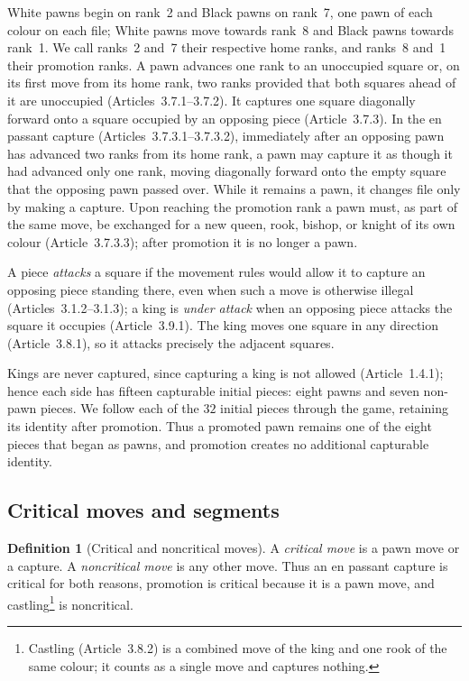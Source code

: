 \documentclass[11pt]{article}
\theoremstyle{definition}
\newtheorem{definition}[theorem]{Definition}
\begin{document}
White pawns begin on rank~2 and Black pawns on rank~7, one pawn of each
colour on each file; White pawns move towards rank~8 and Black pawns
towards rank~1. We call ranks~2 and~7 their respective home
ranks, and ranks~8 and~1 their promotion ranks. A pawn advances one rank to
an unoccupied square or, on its first move from its home rank, two ranks
provided that both squares ahead of it are unoccupied
(Articles~3.7.1--3.7.2). It captures one square diagonally forward onto a
square occupied by an opposing piece (Article~3.7.3). In the en passant
capture (Articles~3.7.3.1--3.7.3.2), immediately after an opposing pawn has
advanced two ranks from its home rank, a pawn may capture it as though it
had advanced only one rank, moving diagonally forward onto the empty square
that the opposing pawn passed over. While it remains a pawn, it changes
file only by making a capture. Upon reaching the promotion rank a pawn
must, as part of the same move, be exchanged for a new queen, rook, bishop,
or knight of its own colour (Article~3.7.3.3); after promotion it is no
longer a pawn.

A piece \emph{attacks} a square if the movement rules would allow it to
capture an opposing piece standing there, even when such a move is
otherwise illegal (Articles~3.1.2--3.1.3); a king is \emph{under attack}
when an opposing piece attacks the square it occupies (Article~3.9.1).
The king moves one square in any direction (Article~3.8.1), so it attacks
precisely the adjacent squares.

Kings are never captured, since capturing a king is not allowed
(Article~1.4.1); hence each side has fifteen capturable initial pieces:
eight pawns and seven non-pawn pieces. We follow each of the $32$ initial
pieces through the game, retaining its identity after promotion. Thus a
promoted pawn remains one of the eight pieces that began as pawns, and
promotion creates no additional capturable identity.

\subsection{Critical moves and segments}

\begin{definition}[Critical and noncritical moves]\label{def:critical}
A \emph{critical move} is a pawn move or a capture. A
\emph{noncritical move} is any other move. Thus an en passant capture is
critical for both reasons, promotion is critical because it is a pawn move, and
castling\footnote{Castling (Article~3.8.2) is a combined move of the king and
one rook of the same colour; it counts as a single move and captures
nothing.} is noncritical.
\end{definition}
\end{document}
